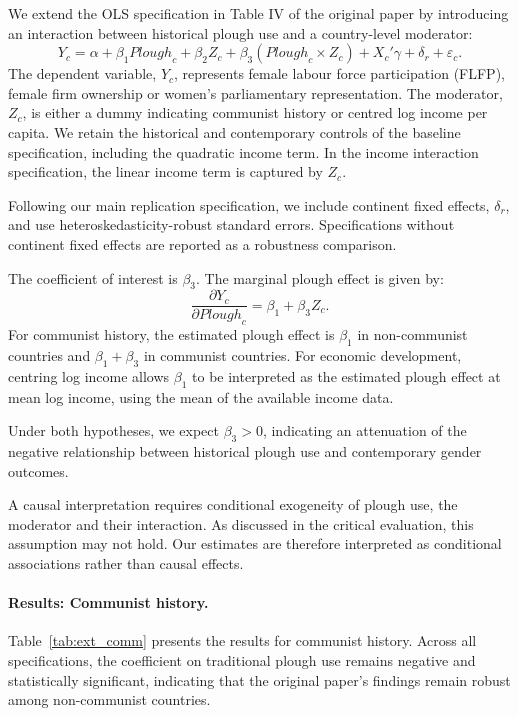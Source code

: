 \documentclass[12pt,a4paper]{article}
\begin{document}
We extend the OLS specification in Table IV of the original paper by introducing an interaction between historical plough use and a country-level moderator:
\begin{equation}
    Y_c = \alpha + \beta_1 \mathit{Plough}_c + \beta_2 Z_c
    + \beta_3 (\mathit{Plough}_c \times Z_c)
    + X_c'\gamma + \delta_r + \varepsilon_c.
    \label{eq:extension}
\end{equation}
The dependent variable, $Y_c$, represents female labour force participation (FLFP), female firm ownership or women's parliamentary representation. The moderator, $Z_c$, is either a dummy indicating communist history or centred log income per capita. We retain the historical and contemporary controls of the baseline specification, including the quadratic income term. In the income interaction specification, the linear income term is captured by $Z_c$.

Following our main replication specification, we include continent fixed effects, $\delta_r$, and use heteroskedasticity-robust standard errors. Specifications without continent fixed effects are reported as a robustness comparison.

The coefficient of interest is $\beta_3$. The marginal plough effect is given by: 
\begin{equation}
    \frac{\partial Y_c}{\partial \mathit{Plough}_c}
    = \beta_1 + \beta_3 Z_c.
    \label{eq:marginal_effect}
\end{equation}
For communist history, the estimated plough effect is $\beta_1$ in non-communist countries and $\beta_1+\beta_3$ in communist countries. For economic development, centring log income allows $\beta_1$ to be interpreted as the estimated plough effect at mean log income, using the mean of the available income data.

Under both hypotheses, we expect $\beta_3 > 0$, indicating an attenuation of the negative relationship between historical plough use and contemporary gender outcomes.

A causal interpretation requires conditional exogeneity of plough use, the moderator and their interaction. As discussed in the critical evaluation, this assumption may not hold.  Our estimates are therefore interpreted as conditional associations rather than causal effects.

\paragraph{Results: Communist history.}
Table~\ref{tab:ext_comm} presents the results for communist history. Across all specifications, the coefficient on traditional plough use remains negative and statistically
significant, indicating that the original paper's findings remain robust among non-communist countries.
\end{document}
